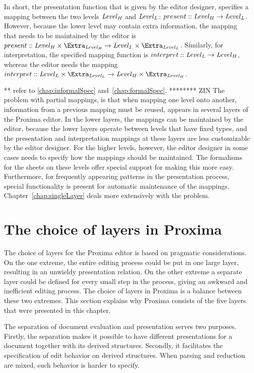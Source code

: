 \documentclass{speauth}
\begin{document}
In short, the presentation function that is given by the editor designer, specifies a mapping between the two levels $\mathit{Level}_{H}$ and $\mathit{Level}_{L}$:  $present :: \mathit{Level}_{H} \rightarrow \mathit{Level}_{L}$. However, because the lower level may contain extra information, the mapping that needs to be maintained by the editor is 
$present :: \Level_{H}\times \Extra_{\Level_{H}} \rightarrow \Level_{L}\times \Extra_{\Level_{L}}$. Similarly, for interpretation, the specified mapping function is 
$interpret :: \mathit{Level}_{L} \rightarrow \mathit{Level}_{H}$, whereas the editor needs the mapping 
$interpret :: \Level_{L} \times \Extra_{\Level_{L}} \rightarrow \Level_{H}\times \Extra_{\Level_{H}}$. 

** refer to \ref{chap:informalSpec} and~\ref{chap:formalSpec}.
******** ZIN
The problem with partial mappings, is that when mapping one level onto another, information from a previous mapping must be reused, appears in several layers of the Proxima editor. In the lower layers, the mappings can be maintained by the editor, because the lower layers operate between levels that have fixed types, and the presentation and interpretation mappings at these layers are less customizable by the editor designer. For the higher levels, however, the editor designer in some cases needs to specify how the mappings should be maintained. The formalisms for the sheets on these levels offer special support for making this more easy. Furthermore, for frequently appearing patterns in the presentation process, special functionality is present for automatic maintenance of the mappings. Chapter~\ref{chap:singleLayer} deals more extensively with the problem.
\ec

%																
%																
%																
\section{The choice of layers in Proxima}

The choice of layers for the Proxima editor is based on pragmatic considerations. On the one extreme, the entire editing process could be put in one large layer, resulting in an unwieldy presentation relation. On the other extreme a separate layer could be defined for every small step in the process, giving an awkward and inefficient editing process. The choice of layers in Proxima is a balance between these two extremes. This section explains why Proxima consists of the five layers that were presented in this chapter.

The separation of document evaluation and presentation serves two purposes. Firstly, the separation makes it possible to have different presentations for a document together with its derived structures. Secondly, it facilitates the specification of edit behavior on derived structures. When parsing and reduction are mixed, such behavior is harder to specify.
\end{document}
